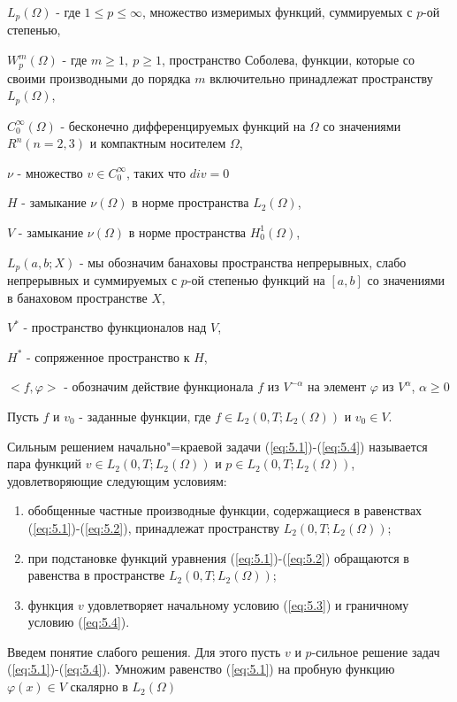 $L_p(\Omega)$ - где $1\leqslant p\leqslant\infty$, множество измеримых функций, суммируемых с $p$-ой степенью,

$W_p^m(\Omega)$ - где $m\geqslant 1, \ p\geqslant 1$, пространство Соболева,
функции, которые со своими производными до порядка $m$ включительно принадлежат пространству $L_p(\Omega)$,

$C_0^{\infty}(\Omega)$ - бесконечно дифференцируемых функций на $\Omega$ со значениями $R^n(n=2, 3)$ и компактным носителем $\Omega$,

$\nu$ - множество $v\in C_0^{\infty}$, таких что $div =0$

$H$ - замыкание $\nu (\Omega)$ в норме пространства $L_2(\Omega)$,

$V$ - замыкание $\nu (\Omega)$ в норме пространства $H_0^1(\Omega)$,

$L_p(a, b;X)$ - мы обозначим банаховы пространства непрерывных, слабо непрерывных и суммируемых с $p$-ой степенью функций на $[a, b]$ со значениями в
банаховом пространстве $X$,

$V^*$ - пространство функционалов над $V$,

$H^*$ - сопряженное пространство к $H$,

$<f,\varphi>$ - обозначим действие функционала $f$ из $V^{-\alpha}$ на элемент $\varphi$ из $V^{\alpha}$, $\alpha\geqslant 0$

Пусть $f$ и $v_0$ - заданные функции,
где $f\in L_2(0, T; L_2(\Omega))$ и $v_0\in V$.

\begin{definition}
    Сильным решением начально"=краевой задачи (\ref{eq:5.1})-(\ref{eq:5.4}) называется пара функций $v\in L_2(0, T; L_2(\Omega))$ и
    $p\in L_2(0, T; L_2(\Omega))$, удовлетворяющие следующим условиям:
\end{definition}

\begin{enumerate} 
    \item обобщенные частные производные функции, содержащиеся в равенствах (\ref{eq:5.1})-(\ref{eq:5.2}), принадлежат пространству $L_2(0, T; L_2(\Omega))$;
    \item при подстановке функций уравнения (\ref{eq:5.1})-(\ref{eq:5.2}) обращаются в равенства в пространстве $L_2(0, T; L_2(\Omega))$;
    \item функция $v$ удовлетворяет начальному условию (\ref{eq:5.3}) и граничному условию (\ref{eq:5.4}).
\end{enumerate}

Введем понятие слабого решения. Для этого пусть $v$ и $p$-сильное решение задач (\ref{eq:5.1})-(\ref{eq:5.4}).
Умножим равенство (\ref{eq:5.1}) на пробную функцию $\varphi (x)\in V$ скалярно в $L_2(\Omega)$

